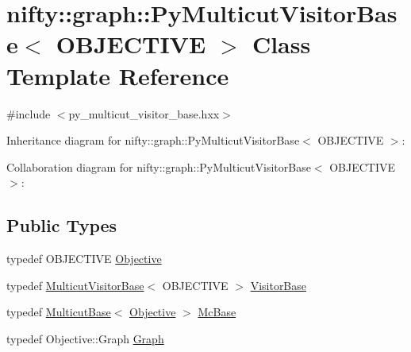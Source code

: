 \hypertarget{classnifty_1_1graph_1_1PyMulticutVisitorBase}{}\section{nifty\+:\+:graph\+:\+:Py\+Multicut\+Visitor\+Base$<$ O\+B\+J\+E\+C\+T\+I\+V\+E $>$ Class Template Reference}
\label{classnifty_1_1graph_1_1PyMulticutVisitorBase}


{\ttfamily \#include $<$py\+\_\+multicut\+\_\+visitor\+\_\+base.\+hxx$>$}



Inheritance diagram for nifty\+:\+:graph\+:\+:Py\+Multicut\+Visitor\+Base$<$ O\+B\+J\+E\+C\+T\+I\+V\+E $>$\+:


Collaboration diagram for nifty\+:\+:graph\+:\+:Py\+Multicut\+Visitor\+Base$<$ O\+B\+J\+E\+C\+T\+I\+V\+E $>$\+:
\subsection*{Public Types}
\begin{DoxyCompactItemize}
\item 
typedef O\+B\+J\+E\+C\+T\+I\+V\+E \hyperlink{classnifty_1_1graph_1_1PyMulticutVisitorBase_af9666edceae59d08a1f74b5e1c178605}{Objective}
\item 
typedef \hyperlink{namespacenifty_1_1graph_a33375e819f3dda82c6458bdc3cfbe81a}{Multicut\+Visitor\+Base}$<$ O\+B\+J\+E\+C\+T\+I\+V\+E $>$ \hyperlink{classnifty_1_1graph_1_1PyMulticutVisitorBase_a5da3ad7df0fe0fafacd0386e887c90dc}{Visitor\+Base}
\item 
typedef \hyperlink{classnifty_1_1graph_1_1MulticutBase}{Multicut\+Base}$<$ \hyperlink{classnifty_1_1graph_1_1PyMulticutVisitorBase_af9666edceae59d08a1f74b5e1c178605}{Objective} $>$ \hyperlink{classnifty_1_1graph_1_1PyMulticutVisitorBase_af330023bad773111484193ae8a7bed03}{Mc\+Base}
\item 
typedef Objective\+::\+Graph \hyperlink{classnifty_1_1graph_1_1PyMulticutVisitorBase_a95007ad5a13cf745ef3722beb0918891}{Graph}
\end{DoxyCompactItemize}
